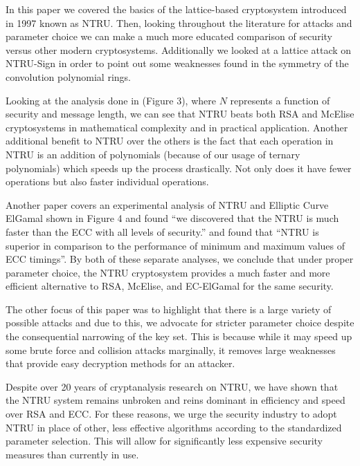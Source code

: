 \documentclass[12pt]{amsart}
\theoremstyle{definition}
\theoremstyle{remark}
\begin{document}
In this paper we covered the basics of the lattice-based cryptosystem introduced in 1997 known as NTRU. Then, looking throughout the literature for attacks and parameter choice we can make a much more educated comparison of security versus other modern cryptosystems. Additionally we looked at a lattice attack on NTRU-Sign in order to point out some weaknesses found in the symmetry of the convolution polynomial rings.

Looking at the analysis done in \cite{NTRUpatent} (Figure 3), where $N$ represents a function of security and message length, we can see that NTRU beats both RSA and McElise cryptosystems in mathematical complexity and in practical application. Another additional benefit to NTRU over the others is the fact that each operation in NTRU is an addition of polynomials (because of our usage of ternary polynomials) which speeds up the process drastically. Not only does it have fewer operations but also faster individual operations. 

Another paper \cite{NguyenThesis} covers an experimental analysis of NTRU and Elliptic Curve ElGamal shown in Figure 4 and found ``we discovered that the NTRU is much faster than the ECC with all levels of security.''  and found that ``NTRU is superior in comparison to the performance of minimum and maximum values of ECC timings''. By both of these separate analyses, we conclude that under proper parameter choice, the NTRU cryptosystem provides a much faster and more efficient alternative to RSA, McElise, and EC-ElGamal for the same security.

The other focus of this paper was to highlight that there is a large variety of possible attacks and due to this, we advocate for stricter parameter choice despite the consequential narrowing of the key set. This is because while it may speed up some brute force and collision attacks marginally, it removes large weaknesses that provide easy decryption methods for an attacker. 

Despite over 20 years of cryptanalysis research on NTRU, we have shown that the NTRU system remains unbroken and reins dominant in efficiency and speed over RSA and ECC. For these reasons, we urge the security industry to adopt NTRU in place of other, less effective algorithms according to the standardized parameter selection. This will allow for significantly less expensive security measures than currently in use.
\end{document}
